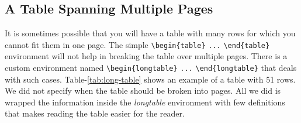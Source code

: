 \subsection{A Table Spanning Multiple Pages}

It is sometimes possible that you will have a table with many rows for which you cannot fit them in one page. The simple \verb|\begin{table}| \verb|...| \verb|\end{table}| environment will not help in breaking the table over multiple pages. There is a custom environment named \verb|\begin{longtable}| \verb|...| \verb|\end{longtable}| that deals with such cases. Table-\ref{tab:long-table} shows an example of a table with 51 rows. We did not specify when the table should be broken into pages. All we did is wrapped the information inside the \emph{longtable} environment with few definitions that makes reading the table easier for the reader. 


